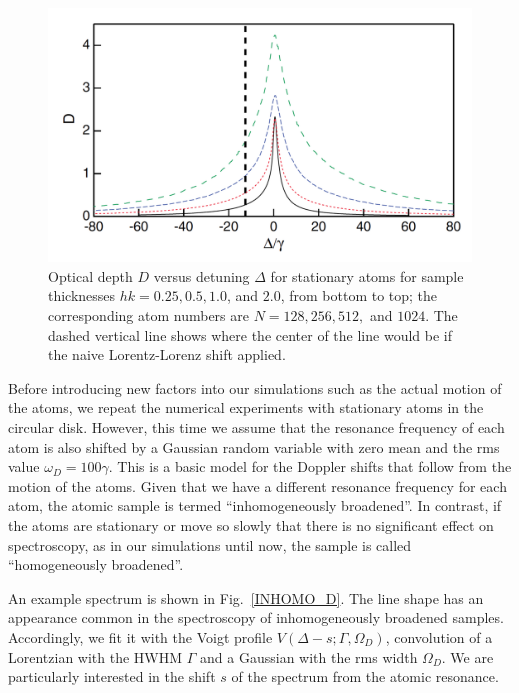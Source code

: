 \begin{figure}[h!]
\begin{center}
\includegraphics[width=\textwidth]{homo_D.pdf}
\end{center}
\caption{Optical depth $D$ versus detuning $\Delta$ for stationary atoms for sample thicknesses $hk=0.25, 0.5, 1.0$, and $2.0$, from bottom to top; the corresponding atom numbers are $N=128, 256, 512,$ and $1024$. The dashed vertical line shows where the center of the line would be if the naive Lorentz-Lorenz shift applied.}
\label{HOMO_D}
\end{figure}

Before introducing new factors into our simulations such as the actual motion of the atoms, we repeat the numerical experiments with stationary atoms in the circular disk. However, this time we assume that the resonance frequency of each atom is also shifted by a Gaussian random variable with zero mean and the rms value $\omega_D=100\gamma$. This is a basic model for the Doppler shifts that follow from the motion of the atoms. Given that we have a different resonance frequency for each atom, the atomic sample is termed ``inhomogeneously broadened''. In contrast, if the atoms are stationary or move so slowly that there is no significant effect on spectroscopy, as in our simulations until now, the sample is called ``homogeneously broadened''.

An example spectrum is shown in Fig.~\ref{INHOMO_D}. The line shape has an appearance common in the spectroscopy of inhomogeneously broadened samples. Accordingly, we fit it with the Voigt profile $V(\Delta-s;\Gamma,\Omega_D)$, convolution of a Lorentzian with the HWHM $\Gamma$ and a Gaussian with the rms width $\Omega_D$. We are particularly interested in the shift $s$ of the spectrum from the atomic resonance.


